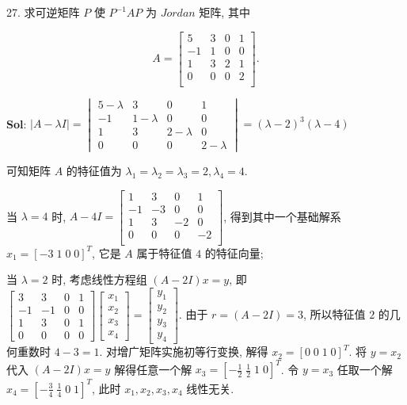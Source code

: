 

27. 求可逆矩阵 $P$ 使 $P^{-1}AP$ 为 $Jordan$ 矩阵, 其中

$$
A=
\begin{bmatrix}
    5&3&0&1\\
    -1&1&0&0\\
    1&3&2&1\\
    0&0&0&2\\
\end{bmatrix}.
$$

\textbf{Sol}: $|A-\lambda I|=\begin{vmatrix}
5-\lambda & 3 & 0 & 1\\
-1 & 1-\lambda & 0 & 0\\
1&3&2-\lambda&0\\
0&0&0&2-\lambda
\end{vmatrix}=(\lambda-2)^3(\lambda-4)$

可知矩阵 $A$ 的特征值为 $\lambda_1=\lambda_2=\lambda_3=2,\lambda_4=4$.

当 $\lambda=4$ 时, $A-4I=\begin{bmatrix}
    1&3&0&1\\
    -1&-3&0&0\\
    1&3&-2&0\\
    0&0&0&-2\\
\end{bmatrix}$, 得到其中一个基础解系 $x_1=[-3\;1\;0\;0]^T$, 它是 $A$ 属于特征值 $4$ 的特征向量;

当 $\lambda=2$ 时, 考虑线性方程组 $(A-2I)x=y$, 即 $\begin{bmatrix}
    3&3&0&1\\
    -1&-1&0&0\\
    1&3&0&1\\
    0&0&0&0
\end{bmatrix}\begin{bmatrix}
    x_1\\x_2\\x_3\\x_4
\end{bmatrix}=\begin{bmatrix}
    y_1\\y_2\\y_3\\y_4
\end{bmatrix}$. 
由于 $r=(A-2I)=3$, 所以特征值 $2$ 的几何重数时 $4-3=1$. 对增广矩阵实施初等行变换, 解得 $x_2=[0\;0\;1\;0]^T$. 将 $y=x_2$ 代入 $(A-2I)x=y$ 解得任意一个解 $x_3=[-\frac{1}{2}\;\frac{1}{2}\;1\;0]^T$. 令 $y=x_3$ 任取一个解 $x_4=[-\frac{3}{4}\;\frac{1}{4}\;0\;1]^T$, 此时 $x_1,x_2,x_3,x_4$ 线性无关.

